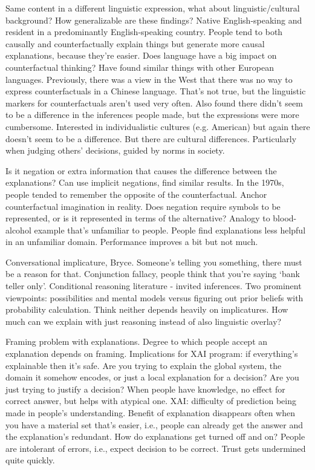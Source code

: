 Same content in a different linguistic expression, what about linguistic/cultural
background?
How generalizable are these findings?
Native English-speaking and resident in a predominantly English-speaking country.
People tend to both causally and counterfactually explain things but generate more
causal explanations, because they're easier.
Does language have a big impact on counterfactual thinking?
Have found similar things with other European languages.
Previously, there was a view in the West that there was no way to express
counterfactuals in a Chinese language.
That's not true, but the linguistic markers for counterfactuals aren't used very often.
Also found there didn't seem to be a difference in the inferences people made, but the
expressions were more cumbersome.
Interested in individualistic cultures (e.g. American) but again there doesn't seem to
be a difference.
But there are cultural differences.
Particularly when judging others' decisions, guided by norms in society.

Is it negation or extra information that causes the difference between the
explanations?
Can use implicit negations, find similar results.
In the 1970s, people tended to remember the opposite of the counterfactual.
Anchor counterfactual imagination in reality.
Does negation require symbols to be represented, or is it represented in terms of the
alternative?
Analogy to blood-alcohol example that's unfamiliar to people.
People find explanations less helpful in an unfamiliar domain.
Performance improves a bit but not much.

Conversational implicature, Bryce.
Someone's telling you something, there must be a reason for that.
Conjunction fallacy, people think that you're saying `bank teller only'.
Conditional reasoning literature - invited inferences.
Two prominent viewpoints: possibilities and mental models versus figuring out prior
beliefs with probability calculation.
Think neither depends heavily on implicatures.
How much can we explain with just reasoning instead of also linguistic overlay?

Framing problem with explanations.
Degree to which people accept an explanation depends on framing.
Implications for XAI program: if everything's explainable then it's safe.
Are you trying to explain the global system, the domain it somehow encodes, or just a
local explanation for a decision?
Are you just trying to justify a decision?
When people have knowledge, no effect for correct answer, but helps with atypical one.
XAI: difficulty of prediction being made in people's understanding.
Benefit of explanation disappears often when you have a material set that's easier,
i.e., people can already get the answer and the explanation's redundant.
How do explanations get turned off and on?
People are intolerant of errors, i.e., expect decision to be correct.
Trust gets undermined quite quickly.

